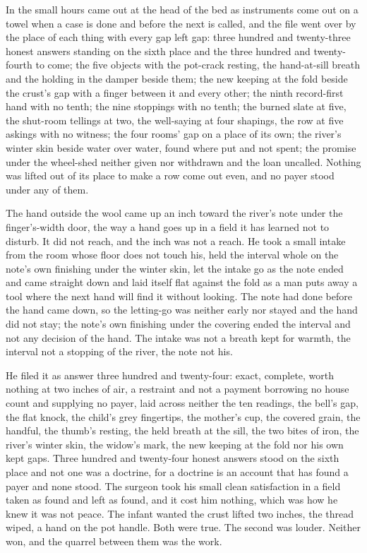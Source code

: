 \scenebreak

In the small hours  came out at the head of the bed as instruments come out on a towel when a case is done and before the next is called, and the file went over by the place of each thing with every gap left gap: three hundred and twenty-three honest answers standing on the sixth place and the three hundred and twenty-fourth to come; the five objects with the pot-crack resting, the hand-at-sill breath and the holding in the damper beside them; the new keeping at the fold beside the crust's gap with a finger between it and every other; the ninth record-first hand with no tenth; the nine stoppings with no tenth; the burned slate at five, the shut-room tellings at two, the well-saying at four shapings, the row at five askings with no witness; the four rooms' gap on a place of its own; the river's winter skin beside water over water, found where put and not spent; the promise under the wheel-shed neither given nor withdrawn and the loan uncalled. Nothing was lifted out of its place to make a row come out even, and no payer stood under any of them.

The hand outside the wool came up an inch toward the river's note under the finger's-width door, the way a hand goes up in a field it has learned not to disturb. It did not reach, and the inch was not a reach. He took a small intake from the room whose floor does not touch his, held the interval whole on the note's own finishing under the winter skin, let the intake go as the note ended and came straight down and laid itself flat against the fold as a man puts away a tool where the next hand will find it without looking. The note had done before the hand came down, so the letting-go was neither early nor stayed and the hand did not stay; the note's own finishing under the covering ended the interval and not any decision of the hand. The intake was not a breath kept for warmth, the interval not a stopping of the river, the note not his.

He filed it as answer three hundred and twenty-four: exact, complete, worth nothing at two inches of air, a restraint and not a payment borrowing no house count and supplying no payer, laid across neither the ten readings, the bell's gap, the flat knock, the child's grey fingertips, the mother's cup, the covered grain, the handful, the thumb's resting, the held breath at the sill, the two bites of iron, the river's winter skin, the widow's mark, the new keeping at the fold nor his own kept gaps. Three hundred and twenty-four honest answers stood on the sixth place and not one was a doctrine, for a doctrine is an account that has found a payer and none stood. The surgeon took his small clean satisfaction in a field taken as found and left as found, and it cost him nothing, which was how he knew it was not peace. The infant wanted the crust lifted two inches, the thread wiped, a hand on the pot handle. Both were true. The second was louder. Neither won, and the quarrel between them was the work.

